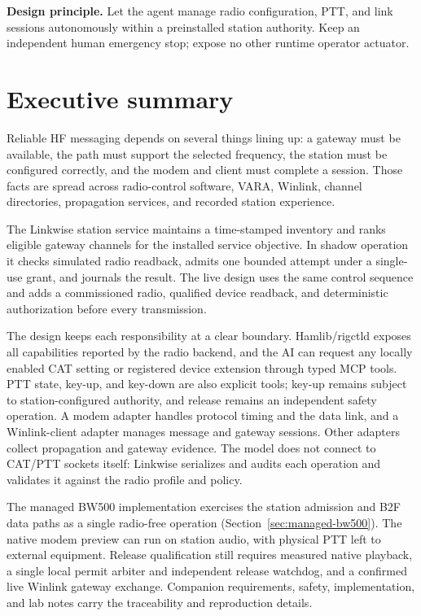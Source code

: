 \documentclass[11pt,a4paper]{article}
\begin{document}
\vspace{0.12in}
\begin{center}
\colorbox{ovpale}{\parbox{0.94\textwidth}{\textbf{Design principle.} Let the agent manage radio configuration, PTT, and link sessions autonomously within a preinstalled station authority. Keep an independent human emergency stop; expose no other runtime operator actuator.}}
\end{center}

\tableofcontents
\newpage

\section{Executive summary}

Reliable HF messaging depends on several things lining up: a gateway must be available, the path must support the selected frequency, the station must be configured correctly, and the modem and client must complete a session. Those facts are spread across radio-control software, VARA, Winlink, channel directories, propagation services, and recorded station experience.

The Linkwise station service maintains a time-stamped inventory and ranks
eligible gateway channels for the installed service objective. In shadow
operation it checks simulated radio readback, admits one bounded attempt
under a single-use grant, and journals the result. The live design uses the
same control sequence and adds a commissioned radio, qualified device
readback, and deterministic authorization before every transmission.

The design keeps each responsibility at a clear boundary. Hamlib/rigctld exposes all capabilities reported by the radio backend, and the AI can request any locally enabled CAT setting or registered device extension through typed MCP tools. PTT state, key-up, and key-down are also explicit tools; key-up remains subject to station-configured authority, and release remains an independent safety operation. A modem adapter handles protocol timing and the data link, and a Winlink-client adapter manages message and gateway sessions. Other adapters collect propagation and gateway evidence. The model does not connect to CAT/PTT sockets itself: Linkwise serializes and audits each operation and validates it against the radio profile and policy.

The managed BW500 implementation exercises the station admission and B2F
data paths as a single radio-free operation
(Section~\ref{sec:managed-bw500}). The native modem preview can run on
station audio, with physical PTT left to external equipment. Release
qualification still requires measured native playback, a single local
permit arbiter and independent release watchdog, and a confirmed live
Winlink gateway exchange. Companion requirements, safety, implementation,
and lab notes carry the traceability and reproduction details.
\end{document}
